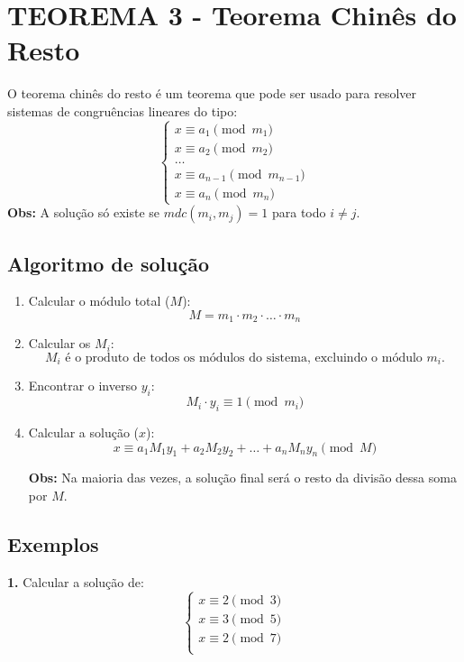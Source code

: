 \section{TEOREMA 3 - Teorema Chinês do Resto}
O teorema chinês do resto é um teorema que pode ser usado para resolver sistemas de congruências lineares do tipo:
\[
    \begin{cases}
        x \equiv a_1 \pmod{m_1}         \\
        x \equiv a_2 \pmod{m_2}         \\
        \dots                           \\
        x \equiv a_{n-1} \pmod{m_{n-1}} \\
        x \equiv a_n \pmod{m_n}
    \end{cases}
\]
\textbf{Obs:} A solução só existe se $mdc(m_i, m_j) = 1$ para todo $i \neq j$.

\subsection{Algoritmo de solução}
\begin{enumerate}
    \item Calcular o módulo total ($M$):
          \[
              M = m_1 \cdot m_2 \cdot \dots \cdot m_n
          \]
    \item Calcular os $M_i$:
          \[
              \text{$M_i$ é o produto de todos os módulos do sistema, excluindo o módulo $m_i$.}
          \]
    \item Encontrar o inverso $y_i$:
          \[
              M_i \cdot y_i \equiv 1 \pmod{m_i}
          \]
    \item Calcular a solução ($x$):
          \[
              x \equiv a_1 M_1 y_1 + a_2 M_2 y_2 + \dots + a_n M_n y_n \pmod M
          \]

          \textbf{Obs:} Na maioria das vezes, a solução final será o resto da divisão dessa soma por $M$.
\end{enumerate}

\subsection*{Exemplos}
\textbf{1.} Calcular a solução de:
\[
    \begin{cases}
        x \equiv 2 \pmod 3 \\
        x \equiv 3 \pmod 5 \\
        x \equiv 2 \pmod 7 \\
    \end{cases}
\]

